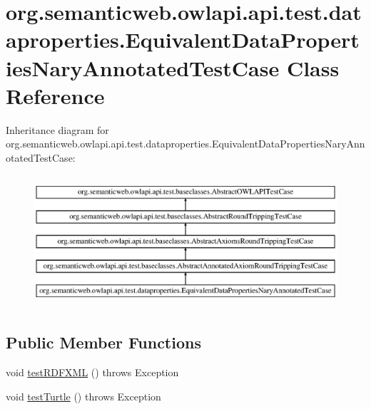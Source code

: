 \hypertarget{classorg_1_1semanticweb_1_1owlapi_1_1api_1_1test_1_1dataproperties_1_1_equivalent_data_properties_nary_annotated_test_case}{\section{org.\-semanticweb.\-owlapi.\-api.\-test.\-dataproperties.\-Equivalent\-Data\-Properties\-Nary\-Annotated\-Test\-Case Class Reference}
\label{classorg_1_1semanticweb_1_1owlapi_1_1api_1_1test_1_1dataproperties_1_1_equivalent_data_properties_nary_annotated_test_case}
}
Inheritance diagram for org.\-semanticweb.\-owlapi.\-api.\-test.\-dataproperties.\-Equivalent\-Data\-Properties\-Nary\-Annotated\-Test\-Case\-:\begin{figure}[H]
\begin{center}
\leavevmode
\includegraphics[height=4.938272cm]{classorg_1_1semanticweb_1_1owlapi_1_1api_1_1test_1_1dataproperties_1_1_equivalent_data_properties_nary_annotated_test_case}
\end{center}
\end{figure}
\subsection*{Public Member Functions}
\begin{DoxyCompactItemize}
\item 
void \hyperlink{classorg_1_1semanticweb_1_1owlapi_1_1api_1_1test_1_1dataproperties_1_1_equivalent_data_properties_nary_annotated_test_case_a7a35875ab26325da8816b99afd1d4e08}{test\-R\-D\-F\-X\-M\-L} ()  throws Exception 
\item 
void \hyperlink{classorg_1_1semanticweb_1_1owlapi_1_1api_1_1test_1_1dataproperties_1_1_equivalent_data_properties_nary_annotated_test_case_a33fa721ae4a2b0725ebc278d71b8c687}{test\-Turtle} ()  throws Exception 
\end{DoxyCompactItemize}
